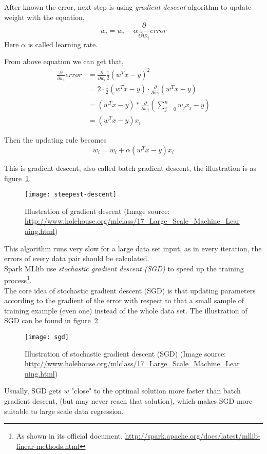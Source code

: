 After known the error, next step is using \emph{gradient descent} algorithm to update weight with the equation,
\begin{equation}
w_i=w_i-\alpha \frac{\partial}{\partial w_i} error
\label{eq:update_equation}
\end{equation}
Here $ \alpha $ is called learning rate.

From above equation we can get that,
\begin{equation}
\begin{split}
\frac{\partial }{\partial w_i} error & = \frac{\partial }{\partial w_i} \frac{1}{2}(w^Tx-y)^2\\
& = 2 \cdot \frac{1}{2} (w^Tx-y) \cdot \frac{\partial }{\partial w_i} (w^Tx-y)\\
& = (w^Tx-y) * \frac{\partial }{\partial w_i} (\sum_{j=0}^{n}w_j x_j - y)\\
& = (w^Tx-y)x_i
\end{split}
\label{eq:partil_error}
\end{equation}

Then the updating rule becomes
\begin{equation}
w_i = w_i + \alpha (w^Tx-y)x_i
\end{equation}

This is gradient descent, also called batch gradient descent, the illustration is as figure~\ref{fg:gradient_descent}.

\begin{figure}[ht]
	\centering
	\texttt{[image: steepest-descent]}
	\caption{Illustration of gradient descent (Image source: \url{http://www.holehouse.org/mlclass/17_Large_Scale_Machine\_Learning.html})}
	\label{fg:gradient_descent}
\end{figure}

This algorithm runs very slow for a large data set input, as in every iteration, the errors of every data pair should be calculated\cite{2_ruder_2016}.\\

Spark MLlib use \emph{stochastic gradient descent (SGD)} to speed up the training process\footnote{As shown in its official document, \url{ http://spark.apache.org/docs/latest/mllib-linear-methods.html}}.\\

The core idea of stochastic gradient descent (SGD) is that updating parameters according to the gradient of the error with respect to that a small sample of training example (even one) instead of the whole data set\cite{2_ruder_2016}. The illustration of SGD can be found in figure~\ref{fg:SGD}
\begin{figure}[h]
	\centering
	\texttt{[image: sgd]}
	\caption{Illustration of stochastic gradient descent (SGD) (Image source: \url{http://www.holehouse.org/mlclass/17_Large_Scale_Machine_Learning.html})}
	\label{fg:SGD}
\end{figure}
Usually, SGD gets $ w $ "close" to the optimal solution more faster than batch gradient descent, (but may never reach that solution), which makes SGD more suitable to large scale data regression.\\


